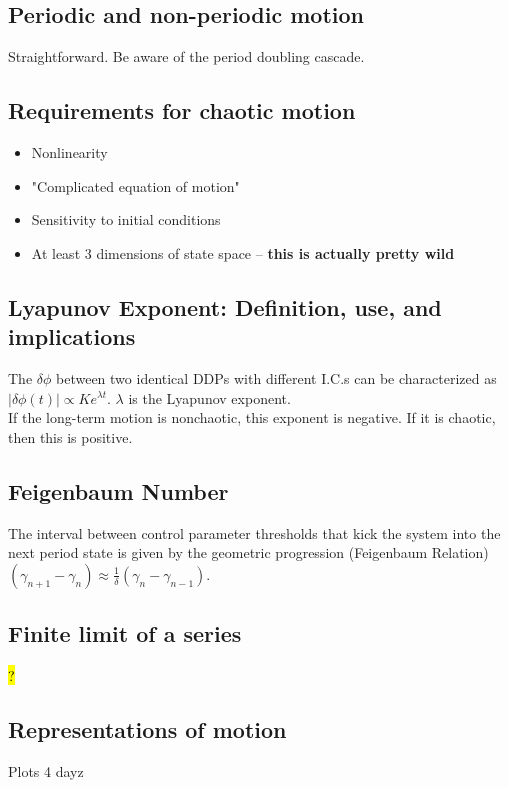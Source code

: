 \documentclass[a4paper, 11pt]{article}
\begin{document}
   \subsection{Periodic and non-periodic motion}
   Straightforward. Be aware of the period doubling cascade.

   \subsection{Requirements for chaotic motion}
   \begin{itemize}
     \item Nonlinearity
     \item "Complicated equation of motion"
     \item Sensitivity to initial conditions
     \item At least 3 dimensions of state space -- \textbf{this is actually pretty wild}
   \end{itemize}


   \subsection{Lyapunov Exponent: Definition, use, and implications}
   The $\delta\phi$ between two identical DDPs with different I.C.s can be
   characterized as $|\delta\phi(t)| \propto Ke^{\lambda t}$. $\lambda$ is the
   Lyapunov exponent.\\

   If the long-term  motion is nonchaotic, this exponent is negative. If it is chaotic,
   then this is positive.\\


   \subsection{Feigenbaum Number}
   The interval between control parameter thresholds that kick the system
   into the next period state is given by the geometric progression (Feigenbaum Relation)
   $(\gamma_{n+1} - \gamma_n) \approx \frac{1}{\delta}(\gamma_n - \gamma_{n-1})$.


   \subsection{Finite limit of a series}
   \hl{?}

   \subsection{Representations of motion}
   Plots 4 dayz



%
\end{document}
